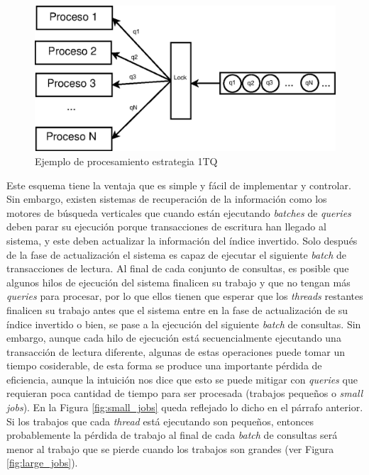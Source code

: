 \begin{figure}[H]
\centering
\includegraphics[scale=.75]{images/1TQ.eps}
\caption{Ejemplo de procesamiento estrategia 1TQ}
\label{fig:1TQ}
\end{figure}

Este esquema tiene la ventaja que es simple y fácil de implementar y controlar. Sin embargo, existen sistemas de recuperación de la información como los motores de búsqueda verticales que cuando están ejecutando \textit{batches} de \textit{queries} deben parar su ejecución porque transacciones de escritura han llegado al sistema, y este deben actualizar la información del índice invertido. Solo después de la fase de actualización el sistema es capaz de ejecutar el siguiente \textit{batch} de transacciones de lectura. Al final de cada conjunto de consultas, es posible que algunos hilos de ejecución del sistema finalicen su trabajo y que no tengan más \textit{queries} para procesar, por lo que ellos tienen que esperar que los \textit{threads} restantes finalicen su trabajo antes que el sistema entre en la fase de actualización de su índice invertido o bien, se pase a la ejecución del siguiente \textit{batch} de consultas.
Sin embargo, aunque cada hilo de ejecución está secuencialmente ejecutando una transacción de lectura diferente, algunas de estas operaciones puede tomar un tiempo cosiderable, de esta forma se produce una importante pérdida de eficiencia, aunque la intuición nos dice que esto se puede mitigar con \textit{queries} que requieran poca cantidad de tiempo para ser procesada (trabajos pequeños o \textit{small jobs}). 
En la Figura \ref{fig:small_jobs} queda reflejado lo dicho en el párrafo anterior. Si los trabajos que cada \textit{thread} está ejecutando son pequeños, entonces probablemente la pérdida de trabajo al final de cada \textit{batch} de consultas será menor al trabajo que se pierde cuando los trabajos son grandes (ver Figura \ref{fig:large_jobs}).  


